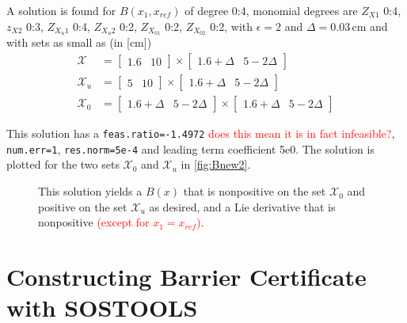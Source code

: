 A solution is found for $B(x_1,x_{ref})$ of degree 0:4, monomial degrees are $Z_{X1}$ 0:4, $z_{X2}$ 0:3, $Z_{X_u1}$ 0:4, $Z_{X_u2}$ 0:2, $Z_{X_01}$ 0:2, $Z_{X_02}$ 0:2, with $\epsilon=2$ and $\Delta=0.03$\,cm and with sets as small as (in [cm])
\begin{subequations}\label{eq:sets_case6}
	\begin{align}
		\mathcal{X} &= \begin{bmatrix} 1.6 & 10\end{bmatrix} \times \begin{bmatrix} 1.6+\Delta & 5-2\Delta\end{bmatrix}\\
		\mathcal{X}_u &= \begin{bmatrix} 5 & 10\end{bmatrix} \times \begin{bmatrix} 1.6+\Delta & 5-2\Delta\end{bmatrix}\\
		\mathcal{X}_0 &= \begin{bmatrix} 1.6+\Delta & 5-2\Delta\end{bmatrix} \times \begin{bmatrix} 1.6+\Delta & 5-2\Delta\end{bmatrix}
	\end{align}
\end{subequations}

This solution has a \texttt{feas.ratio=-1.4972} \textcolor{red}{does this mean it is in fact infeasible?}, \texttt{num.err=1}, \texttt{res.norm=5e-4} and leading term coefficient 5e0. The solution is plotted for the two sets $\mathcal{X}_0$ and $\mathcal{X}_u$ in \autoref{fig:Bnew2}.

\begin{figure}[H]
	\caption{This solution yields a $B(x)$ that is nonpositive on the set $\mathcal{X}_0$ and positive on the set $\mathcal{X}_u$ as desired, and a Lie derivative that is nonpositive \textcolor{red}{(except for $x_1=x_{ref}$)}.}
	\label{fig:Bnew2}
\end{figure}

\newpage
\section{Constructing Barrier Certificate with SOSTOOLS}

